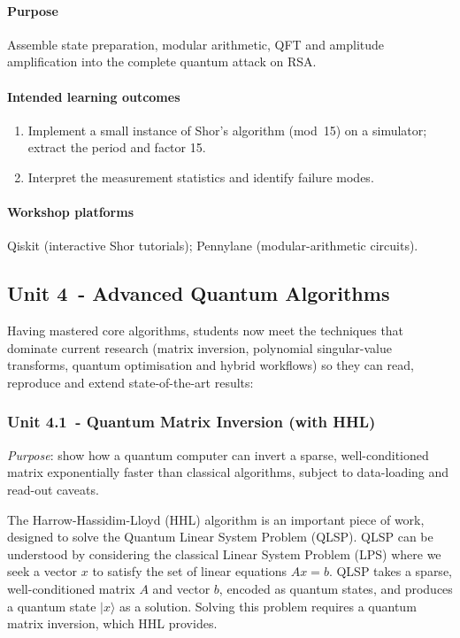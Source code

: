 \paragraph{Purpose}
Assemble state preparation, modular arithmetic, QFT and amplitude amplification into the complete quantum attack on RSA.

\paragraph{Intended learning outcomes}
\begin{enumerate}[label=3.6-\alph*]
	\item Implement a small instance of Shor’s algorithm (mod 15) on a simulator; extract the period and factor 15.                  
	\item Interpret the measurement statistics and identify failure modes.                                                        
\end{enumerate}

\paragraph{Workshop platforms}
Qiskit (interactive Shor tutorials); Pennylane (modular-arithmetic circuits).

\subsection*{Unit 4 - Advanced Quantum Algorithms}

Having mastered core algorithms, students now meet the techniques that dominate current research
(matrix inversion, polynomial singular-value transforms, quantum optimisation and hybrid workflows)
so they can read, reproduce and extend state-of-the-art results:

\subsubsection*{Unit 4.1 - Quantum Matrix Inversion (with HHL)}

\emph{Purpose}: show how a quantum computer can invert a sparse, well-conditioned matrix
exponentially faster than classical algorithms, subject to data-loading and read-out caveats.

The Harrow-Hassidim-Lloyd (HHL) \cite{Harrow:2009} \cite{Lipton:2021} algorithm is an important piece of work, 
designed to solve the Quantum Linear System Problem (QLSP). 
QLSP can be understood by considering the classical Linear System Problem (LPS) where we seek a vector $x$
to satisfy the set of linear equations $Ax = b$.  QLSP takes  a sparse, well-conditioned matrix  $A$ 
and vector $b$, encoded as quantum states, and produces a quantum state $\lvert x\rangle$ as a solution.  
Solving this problem requires a quantum matrix inversion, which HHL provides.

